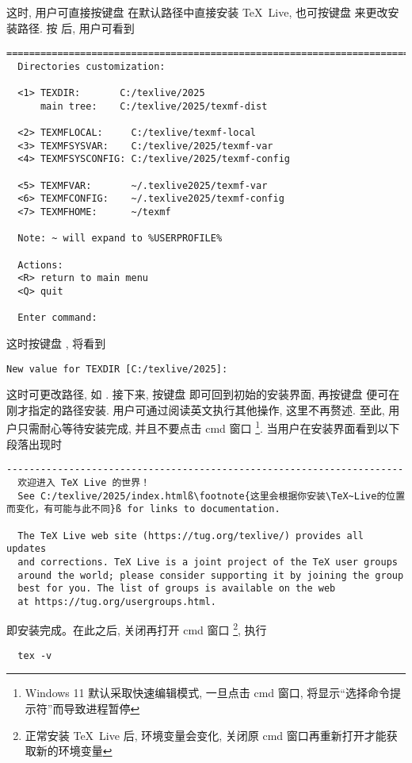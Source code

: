 这时, 用户可直接按键盘  在默认路径中直接安装 \TeX~Live,
也可按键盘  来更改安装路径.
按  后, 用户可看到
\begin{lstlisting}[language = {}]
  ==============================================================================
  Directories customization:
  
  <1> TEXDIR:       C:/texlive/2025
      main tree:    C:/texlive/2025/texmf-dist
  
  <2> TEXMFLOCAL:     C:/texlive/texmf-local
  <3> TEXMFSYSVAR:    C:/texlive/2025/texmf-var
  <4> TEXMFSYSCONFIG: C:/texlive/2025/texmf-config
  
  <5> TEXMFVAR:       ~/.texlive2025/texmf-var
  <6> TEXMFCONFIG:    ~/.texlive2025/texmf-config
  <7> TEXMFHOME:      ~/texmf
  
  Note: ~ will expand to %USERPROFILE%
  
  Actions:
  <R> return to main menu
  <Q> quit
  
  Enter command:
\end{lstlisting}
这时按键盘 , 将看到
\begin{lstlisting}[language = {}]
  New value for TEXDIR [C:/texlive/2025]:
\end{lstlisting}
这时可更改路径, 如 .
接下来, 按键盘  即可回到初始的安装界面,
再按键盘  便可在刚才指定的路径安装.
用户可通过阅读英文执行其他操作, 这里不再赘述. 
至此, 用户只需耐心等待安装完成, 并且不要点击 \textsf{cmd} 窗口%
\footnote{Windows 11 默认采取快速编辑模式, 一旦点击 \textsf{cmd} 窗口,
将显示``选择命令提示符''而导致进程暂停}. 
当用户在安装界面看到以下段落出现时
\begin{lstlisting}[language={},escapechar=ß]
  ----------------------------------------------------------------------
  欢迎进入 TeX Live 的世界！
  See C:/texlive/2025/index.htmlß\footnote{这里会根据你安装\TeX~Live的位置而变化，有可能与此不同}ß for links to documentation.
  
  The TeX Live web site (https://tug.org/texlive/) provides all updates
  and corrections. TeX Live is a joint project of the TeX user groups
  around the world; please consider supporting it by joining the group
  best for you. The list of groups is available on the web
  at https://tug.org/usergroups.html. 
\end{lstlisting}
即安装完成。在此之后, 关闭再打开 \textsf{cmd} 窗口%
\footnote{正常安装 \TeX~Live 后, 环境变量会变化,
关闭原 \textsf{cmd} 窗口再重新打开才能获取新的环境变量},
执行
\begin{lstlisting}
  tex -v
\end{lstlisting}
